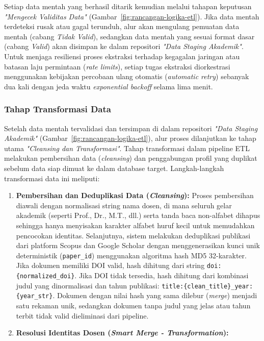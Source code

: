 \documentclass{rapidsart}
\theoremstyle{plain}
\theoremstyle{remark}
\theoremstyle{definition}
\begin{document}
\begin{sloppypar}
\begin{enumerate}
    \end{enumerate}
    Setiap data mentah yang berhasil ditarik kemudian melalui tahapan keputusan \textit{"Mengecek Validitas Data"} (Gambar~\ref{fig:rancangan-logika-etl}). Jika data mentah terdeteksi rusak atau gagal terunduh, alur akan mengulang pemuatan data mentah (cabang \textit{Tidak Valid}), sedangkan data mentah yang sesuai format dasar (cabang \textit{Valid}) akan disimpan ke dalam repositori \textit{"Data Staging Akademik"}. Untuk menjaga resiliensi proses ekstraksi terhadap kegagalan jaringan atau batasan laju permintaan (\textit{rate limits}), setiap tugas ekstraksi diorkestrasi menggunakan kebijakan percobaan ulang otomatis (\textit{automatic retry}) sebanyak dua kali dengan jeda waktu \textit{exponential backoff} selama lima menit.

    \subsubsection{Tahap Transformasi Data}
    Setelah data mentah tervalidasi dan tersimpan di dalam repositori \textit{"Data Staging Akademik"} (Gambar~\ref{fig:rancangan-logika-etl}), alur proses dilanjutkan ke tahap utama \textit{"Cleansing dan Transformasi"}. Tahap transformasi dalam pipeline ETL melakukan pembersihan data (\textit{cleansing}) dan penggabungan profil yang duplikat sebelum data siap dimuat ke dalam database target. Langkah-langkah transformasi data ini meliputi:
    \begin{enumerate}
        \item \textbf{Pembersihan dan Deduplikasi Data (\textit{Cleansing}):} Proses pembersihan diawali dengan normalisasi string nama dosen, di mana seluruh gelar akademik (seperti Prof., Dr., M.T., dll.) serta tanda baca non-alfabet dihapus sehingga hanya menyisakan karakter alfabet huruf kecil untuk memudahkan pencocokan identitas. Selanjutnya, sistem melakukan deduplikasi publikasi dari platform Scopus dan Google Scholar dengan menggenerasikan kunci unik deterministik (\texttt{paper\_id}) menggunakan algoritma hash MD5 32-karakter. Jika dokumen memiliki DOI valid, hash dihitung dari string \texttt{doi:\{normalized\_doi\}}. Jika DOI tidak tersedia, hash dihitung dari kombinasi judul yang dinormalisasi dan tahun publikasi: \texttt{title:\{clean\_title\}\_year:\{year\_str\}}. Dokumen dengan nilai hash yang sama dilebur (\textit{merge}) menjadi satu rekaman unik, sedangkan dokumen tanpa judul yang jelas atau tahun terbit tidak valid dieliminasi dari pipeline.
        \item \textbf{Resolusi Identitas Dosen (\textit{Smart Merge - Transformation}):}

\end{enumerate}
\end{sloppypar}
\end{document}
